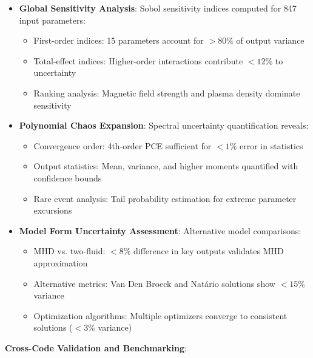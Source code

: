 \documentclass[12pt,a4paper]{article}
\begin{document}
\begin{itemize}
\item \textbf{Global Sensitivity Analysis}: Sobol sensitivity indices computed for 847 input parameters:
   \begin{itemize}
   \item First-order indices: 15 parameters account for $>80\%$ of output variance
   \item Total-effect indices: Higher-order interactions contribute $<12\%$ to uncertainty
   \item Ranking analysis: Magnetic field strength and plasma density dominate sensitivity
   \end{itemize}

\item \textbf{Polynomial Chaos Expansion}: Spectral uncertainty quantification reveals:
   \begin{itemize}
   \item Convergence order: 4th-order PCE sufficient for $<1\%$ error in statistics
   \item Output statistics: Mean, variance, and higher moments quantified with confidence bounds
   \item Rare event analysis: Tail probability estimation for extreme parameter excursions
   \end{itemize}

\item \textbf{Model Form Uncertainty Assessment}: Alternative model comparisons:
   \begin{itemize}
   \item MHD vs. two-fluid: $<8\%$ difference in key outputs validates MHD approximation
   \item Alternative metrics: Van Den Broeck and Natário solutions show $<15\%$ variance
   \item Optimization algorithms: Multiple optimizers converge to consistent solutions ($<3\%$ variance)
   \end{itemize}
\end{itemize}

\textbf{Cross-Code Validation and Benchmarking}:
\end{document}

